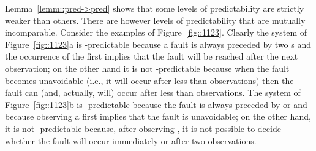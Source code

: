 \documentclass{article}
\begin{document}
Lemma~\ref{lemm::pred->pred} shows that some levels of predictability 
are strictly weaker than others.  
There are however levels of predictability 
that are mutually incomparable.  
Consider the examples of Figure~\ref{fig::1123}.  
Clearly the system of Figure~\ref{fig::1123}a is -predictable 
because a fault is always preceded by two s 
and the occurrence of the first  implies 
that the fault will be reached after the next observation; 
on the other hand it is not -predictable 
because when the fault becomes unavoidable 
(i.e., it will occur after less than  observations) 
then the fault can (and, actually, will) occur after less than  observations.  
The system of Figure~\ref{fig::1123}b is -predictable 
because the fault is always preceded by  or  
and because observing a first  implies that the fault is unavoidable; 
on the other hand, it is not -predictable 
because, after observing , it is not possible to decide 
whether the fault will occur immediately or after two observations.  
\end{document}
